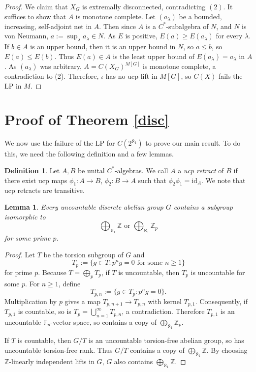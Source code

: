 \documentclass[10pt]{amsart}
\newtheorem{lem}[thm]{Lemma}
\theoremstyle{definition}
\newtheorem{defn}[thm]{Definition}
\begin{document}
\begin{proof}
    We claim that $X_G$ is extremally disconnected, contradicting $(2)$. It suffices to show that $A$ is monotone complete. Let $(a_\lambda)$ be a bounded, increasing, self-adjoint net in $A$. Then since $A$ is a $C^*$-subalgebra of $N$, and $N$ is von Neumann, $a:=\sup_\lambda a_\lambda\in N$. As $E$ is positive, $E(a)\geq E(a_\lambda)$ for every $\lambda$. If $b\in A$ is an upper bound, then it is an upper bound in $N$, so $a\leq b$, so $E(a)\leq E(b)$. Thus $E(a)\in A$ is the least upper bound of $E(a_\lambda)=a_\lambda$ in $A$. As $(a_\lambda)$ was arbitrary, $A=C(X_G)^{M[G]}$ is monotone complete, a contradiction to (2). Therefore, $\iota$ has no ucp lift in $M[G]$, so $C(X)$ fails the LP in $M$.

    
\end{proof}

\section{Proof of Theorem \ref{disc}}

We now use the failure of the LP for $C(2^{\aleph_1})$ to prove our main result. To do this, we need the following definition and a few lemmas.

\begin{defn}
    Let $A,B$ be unital $C^*$-algebras. We call $A$ a \textit{ucp retract} of $B$ if there exist ucp maps $\phi_1: A\rightarrow B$, $\phi_2: B\rightarrow A$ such that $\phi_2\phi_1=\mathrm{id}_A$. We note that ucp retracts are transitive.
\end{defn}

\begin{lem}\label{free}
    Every uncountable discrete abelian group $G$ contains a subgroup isomorphic to
    \[\bigoplus_{\aleph_1}\mathbb{Z}\text{ or }\bigoplus_{\aleph_1}\mathbb{Z}_p\]
    for some prime $p$.
\end{lem}

\begin{proof}
    Let $T$ be the torsion subgroup of $G$ and 
    \[T_p:=\{g\in T:p^ng=0\text{ for some }n\geq 1\}\]
    for prime $p$. Because $T=\bigoplus_p T_p$, if $T$ is uncountable, then $T_p$ is uncountable for some $p$. For $n\geq 1$, define 
    \[T_{p,n}:=\{g\in T_p:p^ng=0\}.\]
    Multiplication by $p$ gives a map $T_{p,n+1}\rightarrow T_{p,n}$ with kernel $T_{p,1}$. Consequently, if $T_{p,1}$ is countable, so is $T_p=\bigcup_{n=1}^\infty T_{p,n}$, a contradiction. Therefore $T_{p,1}$ is an uncountable $\mathbb{F}_p$-vector space, so contains a copy of $\bigoplus_{\aleph_1}\mathbb{Z}_p$.

    If $T$ is countable, then $G/T$ is an uncountable torsion-free abelian group, so has uncountable torsion-free rank. Thus $G/T$ contains a copy of $\bigoplus_{\aleph_1}\mathbb{Z}$. By choosing $\mathbb{Z}$-linearly independent lifts in $G$, $G$ also contains $\bigoplus_{\aleph_1}\mathbb{Z}$.
\end{proof}
\end{document}
